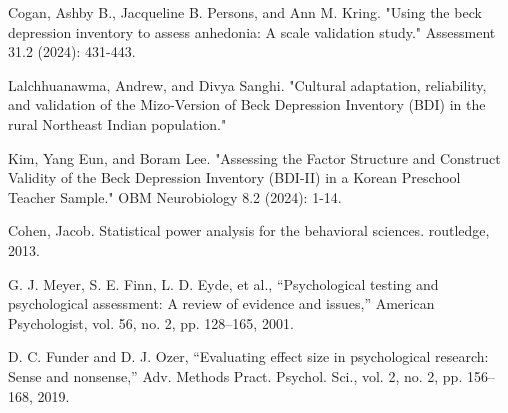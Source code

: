 \documentclass[conference]{IEEEtran}
\begin{document}
\begin{thebibliography}{00}
 Cogan, Ashby B., Jacqueline B. Persons, and Ann M. Kring. "Using the beck depression inventory to assess anhedonia: A scale validation study." Assessment 31.2 (2024): 431-443.

 Lalchhuanawma, Andrew, and Divya Sanghi. "Cultural adaptation, reliability, and validation of the Mizo-Version of Beck Depression Inventory (BDI) in the rural Northeast Indian population."

 Kim, Yang Eun, and Boram Lee. "Assessing the Factor Structure and Construct Validity of the Beck Depression Inventory (BDI-II) in a Korean Preschool Teacher Sample." OBM Neurobiology 8.2 (2024): 1-14.

 Cohen, Jacob. Statistical power analysis for the behavioral sciences. routledge, 2013.

 G. J. Meyer, S. E. Finn, L. D. Eyde, et al., “Psychological testing and psychological assessment: A review of evidence and issues,” American Psychologist, vol. 56, no. 2, pp. 128–165, 2001.


 D. C. Funder and D. J. Ozer, “Evaluating effect size in psychological research: Sense and nonsense,” Adv. Methods Pract. Psychol. Sci., vol. 2, no. 2, pp. 156–168, 2019.

\end{thebibliography}
\end{document}
